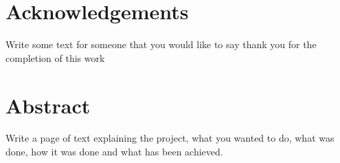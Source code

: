 \section*{Acknowledgements}
Write some text for someone that you would like to say thank you for the completion of this work

\newpage
\section*{Abstract}
Write a page of text explaining the project, what you wanted to do, what was done, how it was done and what has been achieved. 

\newpage
{
\tableofcontents
}